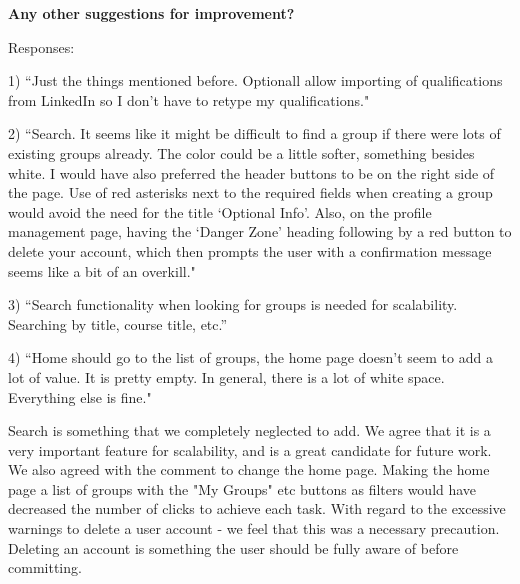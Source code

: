 \documentclass[conference]{IEEEtran}
\begin{document}
\textbf{Any other suggestions for improvement?}

Responses:

1) ``Just the things mentioned before.  Optionall allow importing of qualifications from LinkedIn so I don't have to retype my qualifications."

2) ``Search.  It seems like it might be difficult to find a group if there were lots of existing groups already.  The color could be a little softer, something besides white.  I would have also preferred the header buttons to be on the right side of the page.  Use of red asterisks next to the required fields when creating a group would avoid the need for the title `Optional Info'.  Also, on the profile management page, having the `Danger Zone' heading following by a red button to delete your account, which then prompts the user with a confirmation message seems like a bit of an overkill."

3) ``Search functionality when looking for groups is needed for scalability. Searching by title, course title, etc.''

4) ``Home should go to the list of groups, the home page doesn't seem to add a lot of value.  It is pretty empty. In general, there is a lot of white space.  Everything else is fine."

Search is something that we completely neglected to add.  We agree that it is a very important feature for scalability, and is a great candidate for future work.  We also agreed with the comment to change the home page.  Making the home page a list of groups with the "My Groups" etc buttons as filters would have decreased the number of clicks to achieve each task.  With regard to the excessive warnings to delete a user account - we feel that this was a necessary precaution.  Deleting an account is something the user should be fully aware of before committing.




%
%
\end{document}

